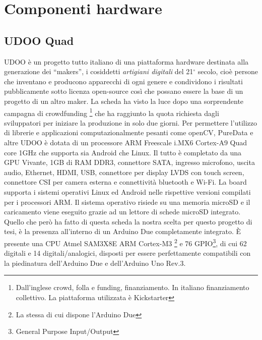 \chapter{Componenti hardware}
\fancyfoot[C]{\thepage } 
\section{UDOO Quad}
UDOO è un progetto tutto italiano di una piattaforma hardware destinata alla 
generazione dei ``makers'', i cosiddetti \emph{artigiani digitali} del 21$^\circ$ secolo,
cioè persone che inventano e producono apparecchi di ogni genere e condividono i risultati 
pubblicamente sotto licenza open-source così che possano essere la base di un 
progetto di un altro maker. La 
scheda ha visto la luce dopo una sorprendente campagna di crowdfunding
\footnote{Dall'inglese crowd, folla e funding, finanziamento. In italiano 
finanziamento collettivo. La piattaforma utilizzata è Kickstarter} che ha raggiunto la quota richiesta dagli sviluppatori 
per iniziare la produzione in solo due giorni. 
Per permettere l'utilizzo di librerie e applicazioni computazionalmente pesanti 
come openCV, PureData e altre UDOO è dotata di un processore ARM Freescale i.MX6 
Cortex-A9 Quad core 1GHz che supporta sia Android che Linux. Il tutto è 
completato da una GPU Vivante, 1GB di RAM DDR3, connettore SATA, ingresso microfono, 
uscita audio, Ethernet, HDMI, USB, connettore per display LVDS 
con touch screen, connettore CSI per camera esterna e connettività bluetooth e 
Wi-Fi. La board supporta i sistemi operativi Linux ed Android nelle rispettive 
versioni compilati per i processori ARM. Il sistema operativo risiede su una memoria 
microSD e il caricamento viene eseguito grazie ad un lettore di schede microSD integrato. 
Quello che però ha fatto di questa scheda la nostra scelta per questo 
progetto di tesi, è la presenza all'interno di un Arduino Due completamente integrato.
È presente una CPU Atmel SAM3X8E ARM Cortex-M3 \footnote{La stessa di cui 
dispone l'Arduino Due} e 76 GPIO\footnote{General Purpose Input/Output}, di 
cui 62 digitali e 14 digitali/analogici, disposti per essere perfettamente 
compatibili con la piedinatura dell'Arduino Due e dell'Arduino Uno Rev.3.

